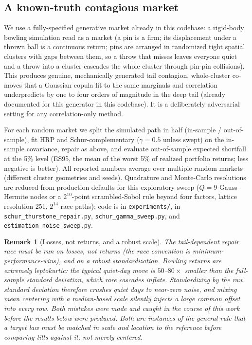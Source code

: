 \documentclass[11pt]{article}
\newtheorem{remark}{Remark}
\begin{document}
\subsection{A known-truth contagious market}

We use a fully-specified generative market already in this codebase: a
rigid-body bowling simulation read as a market (a pin is a firm; its
displacement under a thrown ball is a continuous return; pins are arranged in
randomized tight spatial clusters with gaps between them, so a throw that
misses leaves everyone quiet and a throw into a cluster cascades the whole
cluster through pin-pin collisions). This produces genuine, mechanically
generated tail contagion, whole-cluster co-moves that a Gaussian copula fit
to the same marginals and correlation underpredicts by one to four orders of
magnitude in the deep tail (already documented for this generator in this
codebase). It is a deliberately adversarial setting for any correlation-only
method.

For each random market we split the simulated path in half (in-sample /
out-of-sample), fit HRP and Schur-complementary ($\gamma=0.5$ unless swept)
on the in-sample covariance, repair as above, and evaluate out-of-sample
expected shortfall at the 5\% level (ES95, the mean of the worst 5\% of
realized portfolio returns; less negative is better). All reported numbers
average over multiple random markets (different cluster geometries and
seeds). Quadrature and Monte-Carlo resolutions are reduced from production
defaults for this exploratory sweep ($Q=9$ Gauss--Hermite nodes or a
$2^{10}$-point scrambled-Sobol rule beyond four factors, lattice
resolution 251, $2^{14}$ race paths); code is in \texttt{experiments/}, in
\texttt{schur\_thurstone\_repair.py}, \texttt{schur\_gamma\_sweep.py}, and
\texttt{estimation\_noise\_sweep.py}.

\begin{remark}[Losses, not returns, and a robust scale]
The tail-dependent repair race must be run on \emph{losses}, not returns
(the race convention is minimum-performance-wins), and on a \emph{robust}
standardization. Bowling returns are extremely leptokurtic: the typical
quiet-day move is $50$--$80\times$ smaller than the full-sample standard
deviation, which rare cascades inflate. Standardizing by the raw standard
deviation therefore crushes quiet days to near-zero noise, and mixing mean
centering with a median-based scale silently injects a large common offset
into every row. Both mistakes were made and caught in the course of this
work before the results below were produced. Both are instances of the
general rule that a target law must be matched in scale and location to the
reference before comparing tilts against it, not merely centered.
\end{remark}
\end{document}
